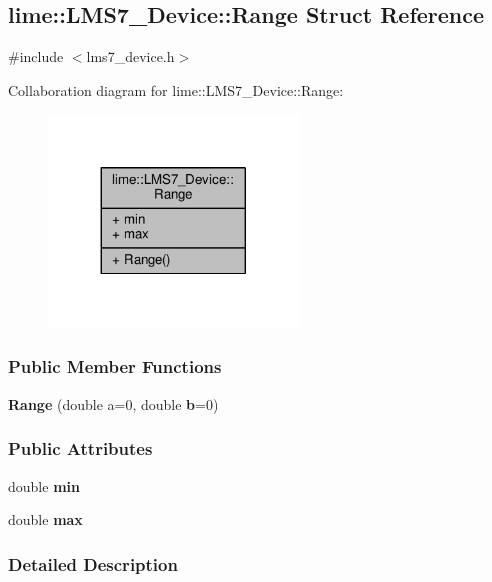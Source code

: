 \subsection{lime\+:\+:L\+M\+S7\+\_\+\+Device\+:\+:Range Struct Reference}
\label{structlime_1_1LMS7__Device_1_1Range}


{\ttfamily \#include $<$lms7\+\_\+device.\+h$>$}



Collaboration diagram for lime\+:\+:L\+M\+S7\+\_\+\+Device\+:\+:Range\+:
\nopagebreak
\begin{figure}[H]
\begin{center}
\leavevmode
\includegraphics[width=188pt]{d8/d55/structlime_1_1LMS7__Device_1_1Range__coll__graph}
\end{center}
\end{figure}
\subsubsection*{Public Member Functions}
\begin{DoxyCompactItemize}
\item 
{\bf Range} (double a=0, double {\bf b}=0)
\end{DoxyCompactItemize}
\subsubsection*{Public Attributes}
\begin{DoxyCompactItemize}
\item 
double {\bf min}
\item 
double {\bf max}
\end{DoxyCompactItemize}


\subsubsection{Detailed Description}


